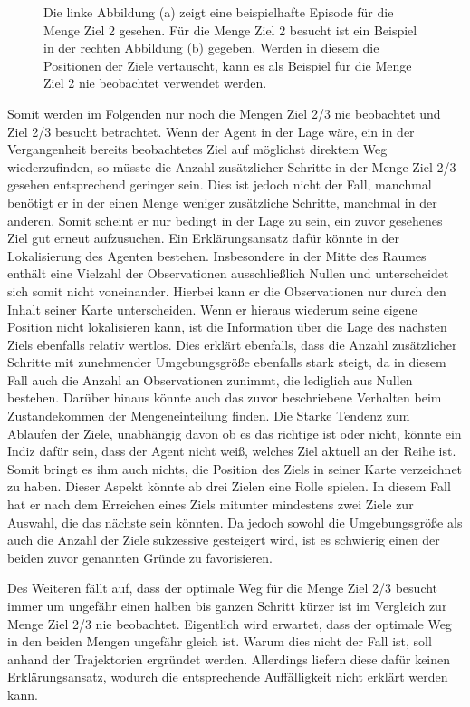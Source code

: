 \begin{figure}[ht!]
\begin{subfigure}[c]{0.5\textwidth}
		\subcaption{}
		\label{sample_visited}
	\end{subfigure}
	\caption{Die linke Abbildung (a) zeigt eine beispielhafte Episode für die Menge \glqq Ziel 2 gesehen\grqq{}. Für die Menge \glqq Ziel 2 besucht\grqq{} ist ein Beispiel in der rechten Abbildung (b) gegeben. Werden in diesem die Positionen der Ziele vertauscht, kann es als Beispiel für die Menge \glqq Ziel 2 nie beobachtet\grqq{} verwendet werden.}
\end{figure}

Somit werden im Folgenden nur noch die Mengen \glqq Ziel 2/3 nie beobachtet\grqq{} und \glqq Ziel 2/3 besucht\grqq{} betrachtet. Wenn der Agent in der Lage wäre, ein in der Vergangenheit bereits beobachtetes Ziel auf möglichst direktem Weg wiederzufinden, so müsste die Anzahl zusätzlicher Schritte in der Menge \glqq Ziel 2/3 gesehen\grqq{} entsprechend geringer sein. Dies ist jedoch nicht der Fall, manchmal benötigt er in der einen Menge weniger zusätzliche Schritte, manchmal in der anderen. Somit scheint er nur bedingt in der Lage zu sein, ein zuvor gesehenes Ziel gut erneut aufzusuchen. Ein Erklärungsansatz dafür könnte in der Lokalisierung des Agenten bestehen. Insbesondere in der Mitte des Raumes enthält eine Vielzahl der Observationen ausschließlich Nullen und unterscheidet sich somit nicht voneinander. Hierbei kann er die Observationen nur durch den Inhalt seiner Karte unterscheiden. Wenn er hieraus wiederum seine eigene Position nicht lokalisieren kann, ist die Information über die Lage des nächsten Ziels ebenfalls relativ wertlos. Dies erklärt ebenfalls, dass die Anzahl zusätzlicher Schritte mit zunehmender Umgebungsgröße ebenfalls stark steigt, da in diesem Fall auch die Anzahl an Observationen zunimmt, die lediglich aus Nullen bestehen. Darüber hinaus könnte auch das zuvor beschriebene Verhalten beim Zustandekommen der Mengeneinteilung finden. Die Starke Tendenz zum Ablaufen der Ziele, unabhängig davon ob es das richtige ist oder nicht, könnte ein Indiz dafür sein, dass der Agent nicht weiß, welches Ziel aktuell an der Reihe ist. Somit bringt es ihm auch nichts, die Position des Ziels in seiner Karte verzeichnet zu haben. Dieser Aspekt könnte ab drei Zielen eine Rolle spielen. In diesem Fall hat er nach dem Erreichen eines Ziels mitunter mindestens zwei Ziele zur Auswahl, die das nächste sein könnten. Da jedoch sowohl die Umgebungsgröße als auch die Anzahl der Ziele sukzessive gesteigert wird, ist es schwierig einen der beiden zuvor genannten Gründe zu favorisieren.

Des Weiteren fällt auf, dass der optimale Weg für die Menge \glqq Ziel 2/3 besucht\grqq{} immer um ungefähr einen halben bis ganzen Schritt kürzer ist im Vergleich zur Menge \glqq Ziel 2/3 nie beobachtet\grqq{}. Eigentlich wird erwartet, dass der optimale Weg in den beiden Mengen ungefähr gleich ist. Warum dies nicht der Fall ist, soll anhand der Trajektorien ergründet werden. Allerdings liefern diese dafür keinen Erklärungsansatz, wodurch die entsprechende Auffälligkeit nicht erklärt werden kann.


